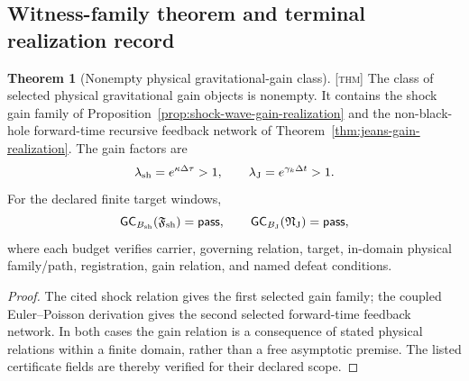 \documentclass[11pt]{article}
\newcommand{\Thm}{\textsc{[thm]}}
\theoremstyle{definition}
\newtheorem{stheorem}[sdefinition]{Theorem}
\begin{document}
\subsection{Witness-family theorem and terminal realization record}
\label{supp:witness-family-theorem}

\begin{stheorem}[Nonempty physical gravitational-gain class]
\label{thm:nonempty-gravitational-gain-class}
\Thm{} The class of selected physical gravitational gain objects is nonempty.
It contains the shock gain family of
Proposition~\ref{prop:shock-wave-gain-realization} and the non-black-hole
forward-time recursive feedback network of
Theorem~\ref{thm:jeans-gain-realization}.  The gain factors are
\begin{equation}
\lambda_{\rm sh}=e^{\kappa\Delta\tau}>1,
\qquad
\lambda_{\rm J}=e^{\gamma_k\Delta t}>1.
\label{eq:two-physical-gains}
\end{equation}
For the declared finite target windows,
\begin{equation}
\mathsf{GC}_{B_{\rm sh}}(\mathfrak F_{\rm sh})=\mathsf{pass},
\qquad
\mathsf{GC}_{B_{\rm J}}(\mathfrak N_{\rm J})=\mathsf{pass},
\label{eq:two-gc-passes}
\end{equation}
where each budget verifies carrier, governing relation, target, in-domain
physical family/path, registration, gain relation, and named defeat conditions.
\end{stheorem}

\begin{proof}
The cited shock relation gives the first selected gain family; the coupled
Euler--Poisson derivation gives the second selected forward-time feedback
network.  In both cases the gain relation is a consequence of stated physical
relations within a finite domain, rather than a free asymptotic premise.  The
listed certificate fields are thereby verified for their declared scope.
\end{proof}
\end{document}
